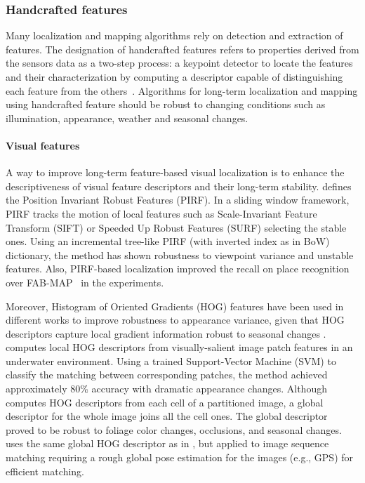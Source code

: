 \subsubsection{Handcrafted features}
\label{sec:discussion:appearance:handcrafted}

Many localization and mapping algorithms rely on detection and extraction of features. The designation of handcrafted features refers to properties derived from the sensors data as a two-step process: a keypoint detector to locate the features and their characterization by computing a descriptor capable of distinguishing each feature from the others~\parencite{discussion:handcrafted-features}.
Algorithms for long-term localization and mapping using handcrafted feature should be robust to changing conditions such as illumination, appearance, weather and seasonal changes.


\paragraph{Visual features}

A way to improve long-term feature-based visual localization is to enhance the descriptiveness of visual feature descriptors and their long-term stability.
\cite{kawewong-et-al:2013:826410} defines the Position Invariant Robust Features (PIRF). In a sliding window framework, PIRF tracks the motion of local features such as Scale-Invariant Feature Transform (SIFT) or Speeded Up Robust Features (SURF) selecting the stable ones.
Using an incremental tree-like PIRF (with inverted index as in BoW) dictionary, the method has shown robustness to viewpoint variance and unstable features. Also, PIRF-based localization improved the recall on place recognition over FAB-MAP~\parencite{discussion:fab-map} in the experiments.

Moreover, Histogram of Oriented Gradients (HOG) features have been used in different works to improve robustness to appearance variance, given that HOG descriptors capture local gradient information robust to seasonal changes \parencite{naseer-et-al:2015:7324181}.
\cite{li-et-al:2015:7139706} computes local HOG descriptors from visually-salient image patch features in an underwater environment. Using a trained Support-Vector Machine (SVM) to classify the matching between corresponding patches, the method achieved approximately 80\% accuracy with dramatic appearance changes.
Although \cite{naseer-et-al:2015:7324181} computes HOG descriptors from each cell of a partitioned image, a global descriptor for the whole image joins all the cell ones. The global descriptor proved to be robust to foliage color changes, occlusions, and seasonal changes.
\cite{vysotska-et-al:2015:7139576} uses the same global HOG descriptor as in \cite{naseer-et-al:2015:7324181}, but applied to image sequence matching requiring a rough global pose estimation for the images (e.g., GPS) for efficient matching.

